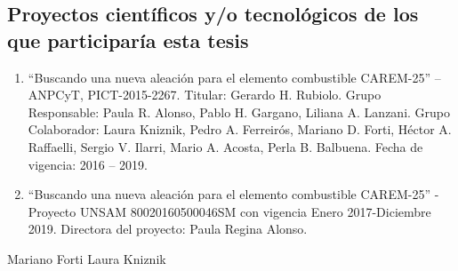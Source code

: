 \subsection{ Proyectos científicos y/o tecnológicos de los que participaría esta tesis  }

\begin{enumerate}


\item “Buscando una nueva aleación para el elemento combustible CAREM-25” – 
ANPCyT, PICT-2015-2267. Titular: Gerardo H. Rubiolo. Grupo Responsable: Paula 
R. Alonso, Pablo H. Gargano, Liliana A. Lanzani. Grupo Colaborador: Laura 
Kniznik, Pedro A. Ferreirós, Mariano D. Forti, Héctor A. Raffaelli, Sergio V. 
Ilarri, Mario A. Acosta, Perla B. Balbuena. Fecha de vigencia: 2016 – 2019.

\item “Buscando una nueva aleación para el elemento combustible CAREM-25” - 
Proyecto UNSAM 80020160500046SM con vigencia Enero 2017-Diciembre 2019. 
Directora del proyecto: Paula Regina Alonso.

\end{enumerate}
















Mariano Forti
Laura Kniznik

